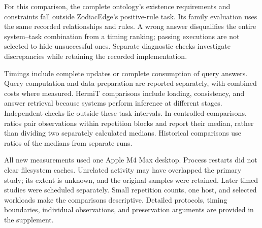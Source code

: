 For this comparison, the complete ontology's existence requirements and
constraints fall outside ZodiacEdge's positive-rule task. Its family evaluation
uses the same recorded relationships and rules. A wrong answer disqualifies
the entire system--task combination from a timing ranking; passing executions
are not selected to hide unsuccessful ones. Separate diagnostic checks
investigate discrepancies while retaining the recorded implementation.

Timings include complete updates or complete consumption of query answers.
Query computation and data preparation are reported separately, with combined
costs where measured. HermiT comparisons include loading, consistency, and
answer retrieval because systems perform inference at different stages.
Independent checks lie outside these task intervals. In controlled comparisons,
ratios pair observations within repetition blocks and report their median,
rather than dividing two separately calculated medians. Historical comparisons
use ratios of the medians from separate runs.

All new measurements used one Apple M4 Max desktop. Process restarts did not clear
filesystem caches. Unrelated activity may have overlapped the primary study;
its extent is unknown, and the original samples were retained. Later timed
studies were scheduled separately. Small repetition counts, one host, and
selected workloads make the comparisons descriptive. Detailed protocols,
timing boundaries, individual observations, and preservation arguments are
provided in the supplement.

